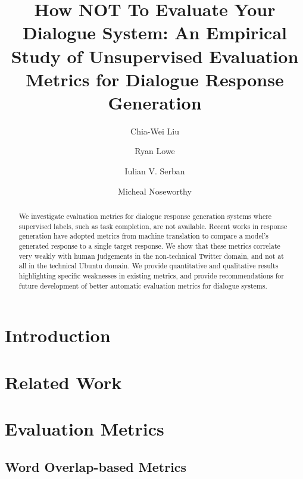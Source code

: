 \documentclass[runningheads]{llncs}
\begin{document}
\title{How NOT To Evaluate Your Dialogue System: An Empirical Study of
Unsupervised Evaluation Metrics for Dialogue Response Generation}

\author{Chia-Wei Liu  \and Ryan Lowe  \and
Iulian V. Serban  \and Micheal Noseworthy }


\maketitle

\begin{abstract}
    We investigate evaluation metrics for dialogue
    response generation systems where supervised
    labels, such as task completion, are not available.
    Recent works in response generation
    have adopted metrics from machine translation
    to compare a model’s generated response
    to a single target response. We show that
    these metrics correlate very weakly with human
    judgements in the non-technical Twitter
    domain, and not at all in the technical Ubuntu
    domain. We provide quantitative and qualitative
    results highlighting specific weaknesses
    in existing metrics, and provide recommendations
    for future development of better automatic
    evaluation metrics for dialogue systems.
\end{abstract}

\section{Introduction}


\section{Related Work}


\section{Evaluation Metrics}
\subsection{Word Overlap-based Metrics}
\end{document}
